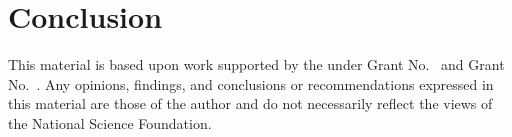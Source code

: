 \documentclass[conference]{IEEEtran}
\begin{document}
\section{Conclusion}

\ifx\paperversion\paperversioncameraIEEE
\else
\begin{acks}                            %
  This material is based upon work supported by the
   under Grant
  No.~ and Grant
  No.~.  Any opinions, findings, and
  conclusions or recommendations expressed in this material are those
  of the author and do not necessarily reflect the views of the
  National Science Foundation.
\end{acks}
\fi

%
\end{document}
